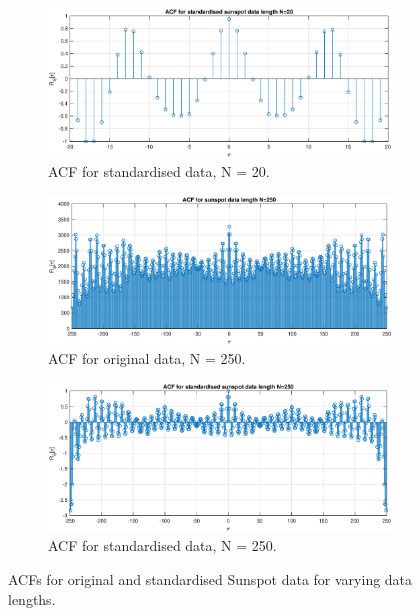 \begin{figure}[H]
\begin{center}
\begin{subfigure}{0.5\textwidth}
  \includegraphics[width=\linewidth]{assignment2figs/acf_sun_norm_20.eps}
  \caption{ACF for standardised data, N = 20.}
  \label{fig:rp2SD}
\end{subfigure}
\medskip
\begin{subfigure}{0.5\textwidth}
  \includegraphics[width=\linewidth]{assignment2figs/acf_sun250.eps}
  \caption{ACF for original data, N = 250.}
  \label{fig:rp3mean}
\end{subfigure}\hfil 
\begin{subfigure}{0.5\textwidth}
  \includegraphics[width=\linewidth]{assignment2figs/acf_sun_norm_250.eps}
  \caption{ACF for standardised data, N = 250.}
  \label{fig:rp3SD}
\end{subfigure}
\caption{ACFs for original and standardised Sunspot data for varying data lengths.}
\label{fig:sun_acfs}
\end{center}
\end{figure}

